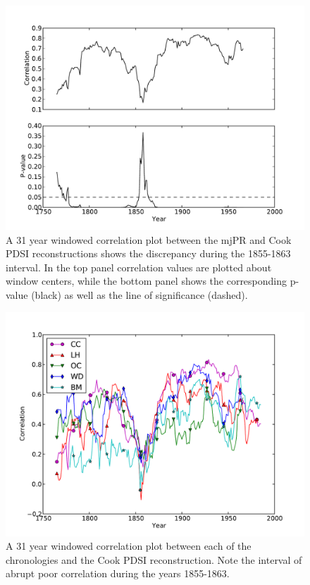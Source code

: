 \begin{figure}
\centering
\includegraphics[width=5in]{figures/reconRunningCorr.pdf}
\caption{A 31 year windowed correlation plot between the mjPR and Cook PDSI reconstructions shows the discrepancy during the 1855-1863 interval. In the top panel correlation values are plotted about window centers, while the bottom panel shows the corresponding p-value (black) as well as the line of significance (dashed).}
\label{fig:reconRunningCorr}
\end{figure}

\begin{figure}
\centering
\includegraphics[width=5in]{figures/cookPdsiRunningCorr.pdf}
\caption{A 31 year windowed correlation plot between each of the chronologies and the Cook PDSI reconstruction. Note the interval of abrupt poor correlation during the years 1855-1863.}
\label{fig:cookRunningPdsiCorr}
\end{figure}

